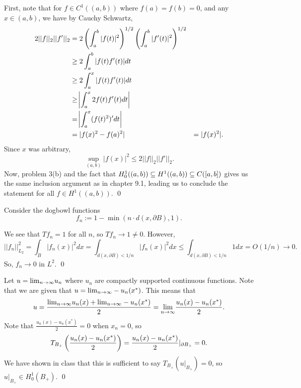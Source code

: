 \documentclass{article}
\renewcommand{\d}{\partial}
\begin{document}
\newpage
{} 
\tri
\hop 
\solution First, note that for $f \in C^1((a,b))$ where $f(a)= f(b)= 0$, and any $x \in (a,b)$, we have by Cauchy Schwartz,
\begin{align*}
    2||f||_2||f'||_2 &= 2\del{\int_a^b|f(t)|^2}^{1/2}\del{\int_a^b |f'(t)|^2}^{1/2}\\
    &\ge 2\int_a^b |f(t)f'(t)|dt \\
    &\ge 2\int_a^x |f(t)f'(t)|dt \\
    &\ge \abs{\int_a^x 2f(t)f'(t)dt} \\
    &= \abs{\int_a^x (f(t)^2)'dt} \\
    &= |f(x)^2 - f(a)^2|
    &= |f(x)^2|.
\end{align*}
Since $x$ was arbitrary, \[\sup_{(a,b)} |f(x)|^2 \le 2||f||_2||f'||_2.\]
Now, problem 3(b) and the fact that $H_0^1((a,b)) \subseteq H^1((a,b)) \subseteq C([a,b])$ gives us the same inclusion argument as in chapter 9.1, leading us to conclude the statement for all $f \in H^1((a,b))$. \qed

\newpage
{} 
\tri
\hop 
\solution Consider the dogbowl functions 
\[f_n := 1-\min(n\cdot d(x, \d B), 1).\]


We see that $Tf_n = 1$ for all $n$, so $Tf_n \to 1 \ne 0$. However, 
\[||f_n||_{L_2}^2 = \int_B |f_n(x)|^2dx = \int_{d(x,\d B)< 1/n} |f_n(x)|^2dx \le  \int_{d(x,\d B)< 1/n} 1 dx  = O(1/n) \to 0.\]
So, $f_n \to 0$ in $L^2$. \qed
 
\newpage
{} 
\tri
\hop 
\solution Let $u = {\lim_{n \to \infty}} u_n$ where $u_n$ are compactly supported continuous functions. Note that we are given that $u = {\lim_{n \to \infty}} -u_n(x^*)$. This means that 
\[u = \frac{ {\lim_{n \to \infty}} u_n(x) + {\lim_{n \to \infty}} -u_n(x^*)}{2}= {\lim_{n \to \infty}} \frac{u_n(x)-u_n(x^*)}{2}.\]
Note that $\frac{u_n(x)-u_n(x^*)}{2}= 0$ when $x_n =0$, so 
\[T_{B_+}\del{\frac{u_n(x)-u_n(x^*)}{2}} =\frac{u_n(x)-u_n(x^*)}{2}|_{\d B_+} = 0.\]
We have shown in class that this is sufficient to say $T_{B_+}(u|_{B_+}) = 0$, so $u|_{B_+}\in H_0^1(B_+)$. \qed
\end{document}
